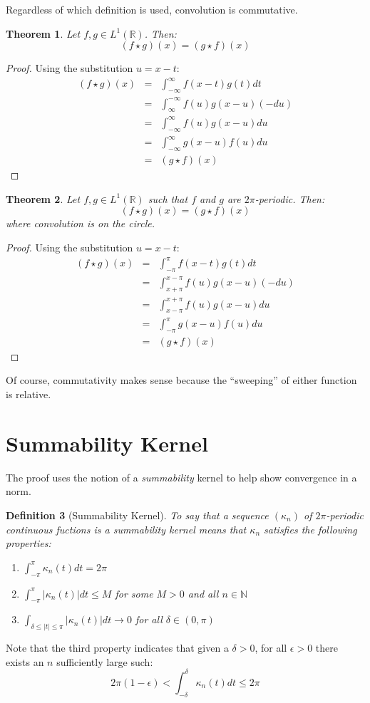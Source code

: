 \documentclass[letterpaper,12pt,fleqn,reqno]{amsart}
\theoremstyle{plain}
\newtheorem{theorem}{Theorem}[section]
\newtheorem{definition}[theorem]{Definition}
\newcommand{\N}{\mathbb{N}}
\newcommand{\R}{\mathbb{R}}
\renewcommand{\d}{\delta}
\newcommand{\e}{\epsilon}
\renewcommand{\k}{\kappa}
\newcommand{\Lor}{L^1(\R)}
\newcommand{\abs}[1]{\left|#1\right|}
\begin{document}
Regardless of which definition is used, convolution is commutative.
\begin{theorem}
  Let $f,g\in\Lor$. Then:
  \[(f\star g)(x)=(g\star f)(x)\]
\end{theorem}

\begin{proof}
  Using the substitution $u=x-t$:
  \begin{eqnarray*}
    (f\star g)(x) &=& \int_{-\infty}^{\infty}f(x-t)g(t)dt \\
    &=& \int_{\infty}^{-\infty}f(u)g(x-u)(-du) \\
    &=& \int_{-\infty}^{\infty}f(u)g(x-u)du \\
    &=& \int_{-\infty}^{\infty}g(x-u)f(u)du \\
    &=& (g\star f)(x)
  \end{eqnarray*}
\end{proof}

\begin{theorem}
  Let $f,g\in\Lor$ such that $f$ and $g$ are $2\pi$-periodic. Then:
  \[(f\star g)(x)=(g\star f)(x)\]
  where convolution is on the circle.
\end{theorem}

\begin{proof}
  Using the substitution $u=x-t$:
  \begin{eqnarray*}
    (f\star g)(x) &=& \int_{-\pi}^{\pi}f(x-t)g(t)dt \\
    &=& \int_{x+\pi}^{x-\pi}f(u)g(x-u)(-du) \\
    &=& \int_{x-\pi}^{x+\pi}f(u)g(x-u)du \\
    &=& \int_{-\pi}^{\pi}g(x-u)f(u)du \\
    &=& (g\star f)(x)
  \end{eqnarray*}
\end{proof}
Of course, commutativity makes sense because the ``sweeping'' of either
function is relative.

\section{Summability Kernel}

The proof uses the notion of a \emph{summability} kernel to help show
convergence in a norm.

\begin{definition}[Summability Kernel]
  To say that a sequence $(\k_n)$ of $2\pi$-periodic continuous fuctions is
  a summability kernel means that $\k_n$ satisfies the following properties:
  \begin{enumerate}
  \item $\int_{-\pi}^{\pi}\k_n(t)dt=2\pi$
  \item $\int_{-\pi}^{\pi}\abs{\k_n(t)}dt\le M$ for some $M>0$ and all
    $n\in\N$
  \item $\int_{\d\le\abs{t}\le\pi}\abs{\k_n(t)}dt\to0$ for all $\d\in(0,\pi)$
  \end{enumerate}
\end{definition}
Note that the third property indicates that given a $\d>0$, for all $\e>0$
there exists an $n$ sufficiently large such:
\[2\pi(1-\e)<\int_{-\d}^{\d}\k_n(t)dt\le2\pi\]
\end{document}
